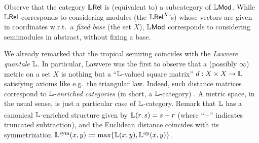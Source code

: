 \documentclass[submission,%
]{eptcs}
\begin{document}
Observe that the category $\mathbb{L} \mathsf{Rel}$ is (equivalent to) a subcategory of $\mathbb{L}\mathsf{Mod}$.
While $\mathbb{L} \mathsf{Rel}$ corresponds to considering modules (the $\mathbb{L} \mathsf{Rel}^X$'s) whose vectors are given in coordinates w.r.t.\ a \emph{fixed base} (the set $X$), $\mathbb{L}\mathsf{Mod}$ corresponds to considering semimodules in abstract, without fixing a base.






We already remarked that the tropical semiring coincides with the \emph{Lawvere quantale} $\mathbb{L}$.
In particular, Lawvere was the first to observe that a (possibly $\infty$) metric on a set $X$ is nothing but a ``$\mathbb{L}$-valued square matrix'' $d:X\times X\to \mathbb{L}$ satisfying axioms like e.g.~the triangular law.
Indeed, such distance matrices correspond to $\mathbb{L}$-\emph{enriched categories} (in short, a $\mathbb{L}$-category) \cite{Lawvere1973, Hofmann2014, Stubbe2014}.
A metric space, in the usual sense, is just a particular case of $\mathbb{L}$-category.
Remark that $\mathbb{L}$ has a canonical $\mathbb{L}$-enriched structure given by $\mathbb{L}(r,s)=s \overset{\cdot}{-} r$ (where ``$ \overset{\cdot}{-}$'' indicates truncated subtraction), 
and the Euclidean distance coincides with its symmetrization $\mathbb{L}^{\mathrm{sym}}(x,y):=\max\{\mathbb{L}(x,y),\mathbb{L}^{\mathrm{op}}(x,y)\}$.
\end{document}
